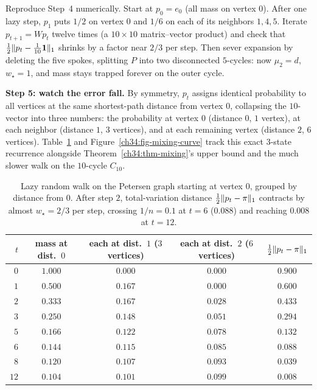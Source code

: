 \begin{labbox}
Reproduce Step~4 numerically. Start at $p_0=e_0$ (all mass on vertex $0$). After one lazy step, $p_1$ puts $1/2$ on vertex $0$ and $1/6$ on each of its neighbors $1,4,5$. Iterate $p_{t+1}=Wp_t$ twelve times (a $10\times 10$ matrix--vector product) and check that $\frac{1}{2}\lVert p_t-\frac{1}{10}\mathbf{1}\rVert_1$ shrinks by a factor near $2/3$ per step. Then sever expansion by deleting the five spokes, splitting $P$ into two disconnected $5$-cycles: now $\mu_2=d$, $w_\star=1$, and mass stays trapped forever on the outer cycle.
\end{labbox}

\textbf{Step 5: watch the error fall.} By symmetry, $p_t$ assigns identical probability to all vertices at the same shortest-path distance from vertex $0$, collapsing the $10$-vector into three numbers: the probability at vertex $0$ (distance $0$, $1$ vertex), at each neighbor (distance $1$, $3$ vertices), and at each remaining vertex (distance $2$, $6$ vertices). Table~\ref{ch34:tab-mixing} and Figure~\ref{ch34:fig-mixing-curve} track this exact $3$-state recurrence alongside Theorem~\ref{ch34:thm-mixing}'s upper bound and the much slower walk on the $10$-cycle $C_{10}$.

\begin{table}[htbp]
\centering
\begin{tabular}{rcccc}
\toprule
$t$ & mass at dist.\ $0$ & each at dist.\ $1$ ($3$ vertices) & each at dist.\ $2$ ($6$ vertices) & $\tfrac{1}{2}\lVert p_t-\pi\rVert_1$ \\
\midrule
$0$ & $1.000$ & $0.000$ & $0.000$ & $0.900$ \\
$1$ & $0.500$ & $0.167$ & $0.000$ & $0.600$ \\
$2$ & $0.333$ & $0.167$ & $0.028$ & $0.433$ \\
$3$ & $0.250$ & $0.148$ & $0.051$ & $0.294$ \\
$5$ & $0.166$ & $0.122$ & $0.078$ & $0.132$ \\
$6$ & $0.144$ & $0.115$ & $0.085$ & $0.088$ \\
$8$ & $0.120$ & $0.107$ & $0.093$ & $0.039$ \\
$12$& $0.104$ & $0.101$ & $0.099$ & $0.008$ \\
\bottomrule
\end{tabular}
\caption{Lazy random walk on the Petersen graph starting at vertex $0$, grouped by distance from $0$. After step $2$, total-variation distance $\frac{1}{2}\lVert p_t-\pi\rVert_1$ contracts by almost $w_\star=2/3$ per step, crossing $1/n=0.1$ at $t=6$ ($0.088$) and reaching $0.008$ at $t=12$.}
\label{ch34:tab-mixing}
\end{table}

